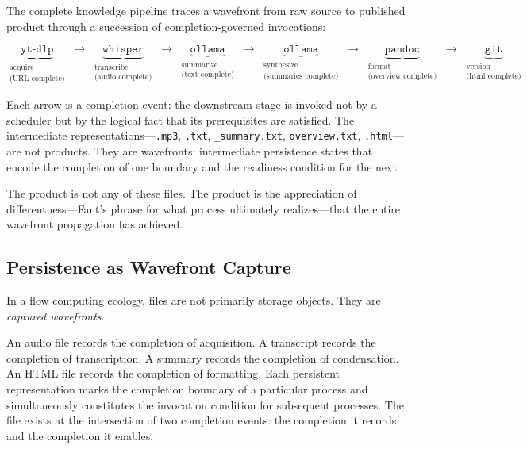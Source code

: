 \documentclass[12pt, a4paper]{article}
\begin{document}
The complete knowledge pipeline traces a wavefront from raw source
to published product through a succession of completion-governed
invocations:

\[
\underbrace{\texttt{yt-dlp}}_{\substack{\text{acquire}\\\text{(URL complete)}}}
\;\to\;
\underbrace{\texttt{whisper}}_{\substack{\text{transcribe}\\\text{(audio complete)}}}
\;\to\;
\underbrace{\texttt{ollama}}_{\substack{\text{summarize}\\\text{(text complete)}}}
\;\to\;
\underbrace{\texttt{ollama}}_{\substack{\text{synthesize}\\\text{(summaries complete)}}}
\;\to\;
\underbrace{\texttt{pandoc}}_{\substack{\text{format}\\\text{(overview complete)}}}
\;\to\;
\underbrace{\texttt{git}}_{\substack{\text{version}\\\text{(html complete)}}}
\]

Each arrow is a completion event: the downstream stage is invoked
not by a scheduler but by the logical fact that its prerequisites
are satisfied. The intermediate representations---\texttt{.mp3},
\texttt{.txt}, \texttt{\_summary.txt}, \texttt{overview.txt},
\texttt{.html}---are not products. They are wavefronts: intermediate
persistence states that encode the completion of one boundary and
the readiness condition for the next.

The product is not any of these files. The product is the
appreciation of differentness---Fant's phrase for what process
ultimately realizes---that the entire wavefront propagation has
achieved.

\subsection{Persistence as Wavefront Capture}

In a flow computing ecology, files are not primarily storage objects.
They are \emph{captured wavefronts}.

An audio file records the completion of acquisition. A transcript
records the completion of transcription. A summary records the
completion of condensation. An HTML file records the completion of
formatting. Each persistent representation marks the completion
boundary of a particular process and simultaneously constitutes
the invocation condition for subsequent processes. The file exists
at the intersection of two completion events: the completion it
records and the completion it enables.
\end{document}
